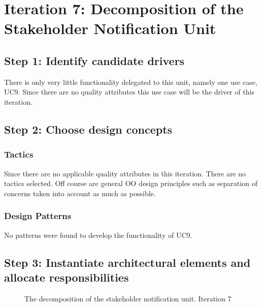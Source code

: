 \section{Iteration 7: Decomposition of the Stakeholder Notification Unit}
\label{add:it7}

\subsection{Step 1: Identify candidate drivers}
\label{add:it7/drivers}

\npar There is only very little functionality delegated to this unit, namely one
use case, UC9. Since there are no quality attributes this use case will be the
driver of this iteration.

\subsection{Step 2: Choose design concepts}
\label{add:it7/concepts}

\subsubsection{Tactics}
\label{add:it7/tactics}

\npar Since there are no applicable quality attributes in this iteration. There
are no tactics selected. Off course are general OO design principles such as
separation of concerns taken into account as much as possible.

\subsubsection{Design Patterns}
\label{add:it7/patterns}

\npar No patterns were found to develop the functionality of UC9.

\subsection{Step 3: Instantiate architectural elements and allocate responsibilities}
\label{add:it7/elements}

\begin{figure}[H]
	\begin{centering}
		\caption{The decomposition of the stakeholder notification unit. Iteration 7}
		\label{fig:add/it7/decomposition}
	\end{centering}
\end{figure}

